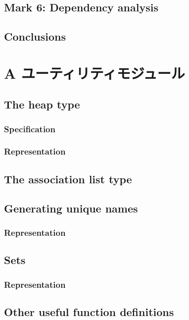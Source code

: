 \documentclass{jarticle}
\begin{document}
\subsection{Mark 6: Dependency analysis}
\subsection{Conclusions}
\newpage

\section{A ユーティリティモジュール}

\subsection{The heap type}
\subsubsection{Specification}
\subsubsection{Representation}

\subsection{The association list type}

\subsection{Generating unique names}
\subsubsection{Representation}

\subsection{Sets}
\subsubsection{Representation}

\subsection{Other useful function definitions}
\end{document}
